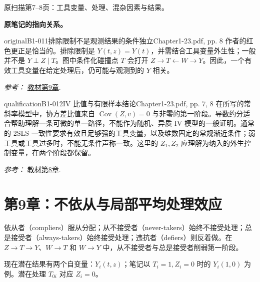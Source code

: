 {\begin{center}
\begin{tikzpicture}[>=Stealth, font=\small, line width=.65pt]
\end{tikzpicture}
\par{\small 原扫描第7--8页：工具变量、处理、混杂因素与结果。}
\end{center}
\par{}\smallskip\textbf{原笔记的指向关系。}\par\smallskip
{}
\begin{reviewnote}{original}{B1-011}{排除限制不是观测结果的条件独立}{Chapter1-23.pdf, pp. 8}
作者的红色更正是恰当的。排除限制是 $Y(t,z)=Y(t)$，并需结合工具变量外生性；一般并不是 $Y\perp Z\mid T$。图中条件化碰撞点 $T$ 会打开 $Z\to T\leftarrow W\to Y$。因此，一个有效工具变量在给定处理后，仍可能与观测到的 $Y$ 相关。
\par\smallskip\textit{参考：} \href{https://matheusfacure.github.io/python-causality-handbook/09-Non-Compliance-and-LATE.html}{教材第9章}.
\end{reviewnote}

\begin{reviewnote}{qualification}{B1-012}{IV 比值与有限样本结论}{Chapter1-23.pdf, pp. 7, 8}
在所写的常斜率模型中，协方差比值来自 $\operatorname{Cov}(Z,v)=0$ 与非零的第一阶段。导数约分适合帮助理解一条可微的单一路径，不能作为随机、异质 IV 模型的一般证明。通常的 2SLS 一致性要求有效且足够强的工具变量，以及维数固定的常规渐近条件；弱工具或工具过多时，不能无条件声称一致。这里的 $Z_1,Z_2$ 应理解为纳入的外生控制变量，在两个阶段都保留。
\par\smallskip\textit{参考：} \href{https://matheusfacure.github.io/python-causality-handbook/08-Instrumental-Variables.html}{教材第8章}.
\end{reviewnote}
\section{第9章：不依从与局部平均处理效应}
依从者（compliers）服从分配；从不接受者（never-takers）始终不接受处理；总是接受者（always-takers）始终接受处理；违抗者（defiers）则反着做。在 $Z\to T\to Y$、$W\to T$ 和 $W\to Y$ 中，从不接受者与总是接受者削弱第一阶段。

现在潜在结果有两个自变量：$Y_i(t,z)$；笔记以 $T_i=1,Z_i=0$ 时的 $Y_i(1,0)$ 为例。潜在处理 $T_{0i}$ 对应 $Z_i=0$。
}
